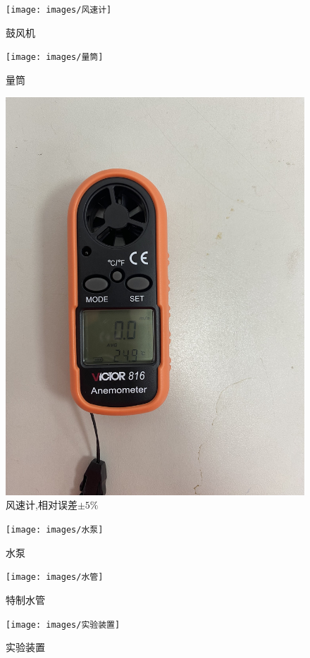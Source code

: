 \documentclass[UTF8]{gapd}
\begin{document}
\begin{figure}[H]%
	\centering
	\texttt{[image: images/风速计]}
	\caption{鼓风机}
	\label{fig:P7}%
\end{figure}
\begin{figure}[H]%
	\centering
	\texttt{[image: images/量筒]}
	\caption{量筒}
	\label{fig:P8}%
\end{figure}
\begin{figure}[H]%
	\centering
	\includegraphics[width=0.8\columnwidth]{images/风速计1}
	\caption{风速计,相对误差$		\pm 5\%		$}
	\label{fig:P9}%
\end{figure}
\begin{figure}[H]%
	\centering
	\texttt{[image: images/水泵]}
	\caption{水泵}
	\label{fig:P10}%
\end{figure}
\begin{figure}[H]%
	\centering
	\texttt{[image: images/水管]}
	\caption{特制水管}
	\label{fig:P11}%
\end{figure}
\begin{figure}[H]%
	\centering
	\texttt{[image: images/实验装置]}
	\caption{实验装置}
	\label{fig:P12}%
\end{figure}
\end{document}
